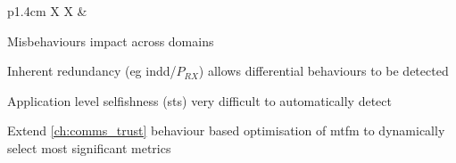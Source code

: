 \begin{table}
{\begin{tabularx}{\textwidth}{p{1.4cm} X X}
			& \begin{minipage}[t]{\linewidth}
				\begin{tightimize} 
					\item Misbehaviours impact across domains %
					\item Inherent redundancy (eg \gls{indd}/$P_{RX}$) allows differential behaviours to be detected %
					\item Application level selfishness (\gls{sts}) very difficult to automatically detect
					\item Extend \autoref{ch:comms_trust} behaviour based optimisation of \gls{mtfm} to dynamically select most significant metrics
				\end{tightimize}
			\end{minipage}\\
			\bottomrule
		\end{tabularx}
	}
\end{table}





